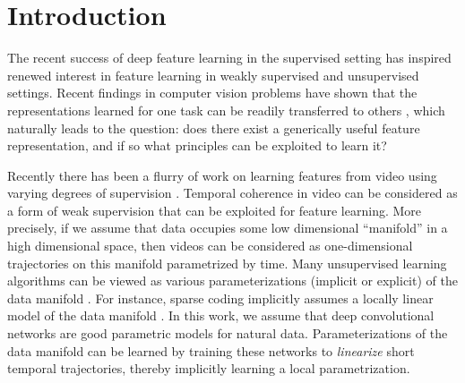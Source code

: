 
\section{Introduction}
The recent success of deep feature learning in the supervised setting has inspired renewed interest in feature learning in weakly supervised and unsupervised settings. Recent findings in computer vision problems have shown that the representations learned for one task can be readily transferred to others \cite{imageNetTransfer}, which naturally leads to the question: does there exist a generically useful feature representation, and if so what principles can be exploited to learn it? 

%
%

Recently there has been a flurry of work on learning features from video using varying degrees of supervision \cite{supFromTracker}\cite{FBvideo}\cite{predAlexNet}. Temporal coherence in video can be considered as a form of weak supervision that can be exploited for feature learning. More precisely, if we assume that data occupies some low dimensional ``manifold'' in a high dimensional space, then videos can be considered as one-dimensional trajectories on this manifold parametrized by time. Many unsupervised learning algorithms can be viewed as various parameterizations (implicit or explicit) of the data manifold \cite{Bengio2012}. For instance, sparse coding implicitly assumes a locally linear model of the data manifold \cite{sparseCoding}. In this work, we assume that deep convolutional networks are good parametric models for natural data. Parameterizations of the data manifold can be learned by training these networks to \emph{linearize} short temporal trajectories, thereby implicitly learning a local parametrization.   

